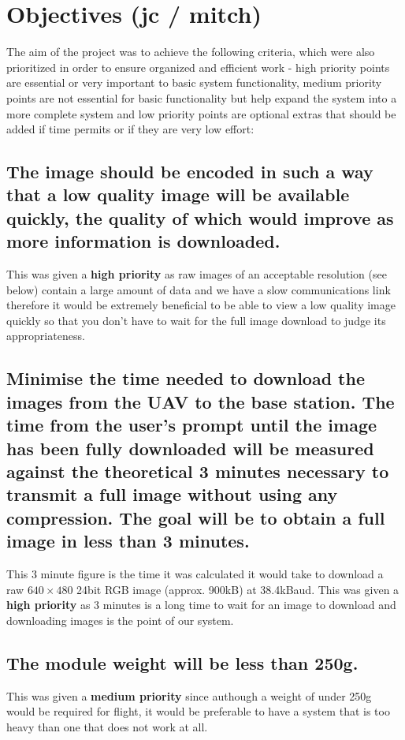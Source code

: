 \section{Objectives (jc / mitch)} 

The aim of the project was to achieve the following criteria, which were also prioritized in order to ensure organized and efficient work - high priority points are essential or very important to basic system functionality, medium priority points are not essential for basic functionality but help expand the system into a more complete system and low priority points are optional extras that should be added if time permits or if they are very low effort:

	\subsection{The image should be encoded in such a way that a low quality image will be available quickly, the quality of which would improve as more information is downloaded.} \label{sec:spec_a}
This was given a \textbf{high priority} as raw images of an acceptable resolution (see below) contain a large amount of data and we have a slow communications link therefore it would be extremely beneficial to be able to view a low quality image quickly so that you don't have to wait for the full image download to judge its appropriateness.
	\subsection{Minimise the time needed to download the images from the UAV to the base station. The time from the user’s prompt until the image has been fully downloaded will be measured against the theoretical 3 minutes necessary to transmit a full image without using any compression. The goal will be to obtain a full image in \textbf{less than 3 minutes.}} \label{sec:spec_b} 
This 3 minute figure is the time it was calculated it would take to download a raw $640\times480$ 24bit RGB image (approx. 900kB) at 38.4kBaud. This was given a \textbf{high priority} as 3 minutes is a long time to wait for an image to download and downloading images is the point of our system.
	\subsection{The module weight will be \textbf{less than 250g}.} \label{sec:spec_c} 
This was given a \textbf{medium priority} since authough a weight of under 250g would be required for flight, it would be preferable to have a system that is too heavy than one that does not work at all.%
